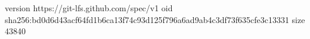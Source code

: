 version https://git-lfs.github.com/spec/v1
oid sha256:bd0d6d43acf64fd1b6ca13f74c93d125f796a6ad9ab4c3df73f635cfe3c13331
size 43840
